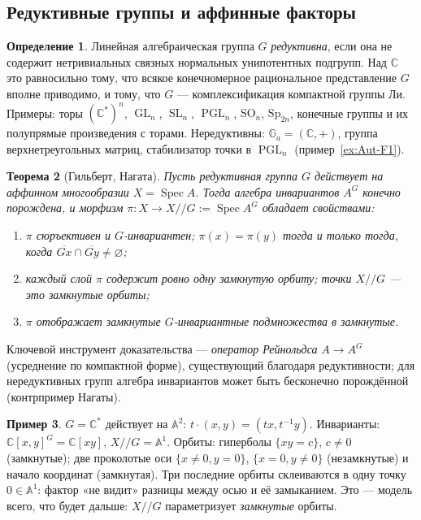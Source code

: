 \documentclass[11pt,a4paper]{article}
\theoremstyle{plain}
\newtheorem{theorem}{Теорема}[section]
\theoremstyle{definition}
\newtheorem{definition}[theorem]{Определение}
\newtheorem{example}[theorem]{Пример}
\theoremstyle{remark}
\renewcommand{\C}{\mathbb{C}}
\newcommand{\A}{\mathbb{A}}
\DeclareMathOperator{\GL}{GL}
\DeclareMathOperator{\SL}{SL}
\DeclareMathOperator{\PGL}{PGL}
\DeclareMathOperator{\Spec}{Spec}
\begin{document}
\subsection{Редуктивные группы и аффинные факторы}

\begin{definition}
Линейная алгебраическая группа $G$ \emph{редуктивна}, если она не содержит нетривиальных связных
нормальных унипотентных подгрупп. Над $\C$ это равносильно тому, что всякое конечномерное
рациональное представление $G$ вполне приводимо, и тому, что $G$ --- комплексификация компактной
группы Ли. Примеры: торы $(\C^*)^n$, $\GL_n$, $\SL_n$, $\PGL_n$, $\mathrm{SO}_n$, $\mathrm{Sp}_{2n}$,
конечные группы и их полупрямые произведения с торами. Нередуктивны: $\mathbb G_a=(\C,+)$,
группа верхнетреугольных матриц, стабилизатор точки в $\PGL_n$ (пример~\ref{ex:Aut-F1}).
\end{definition}

\begin{theorem}[Гильберт, Нагата]\label{thm:Hilbert-finiteness}
Пусть редуктивная группа $G$ действует на аффинном многообразии $X=\Spec A$. Тогда алгебра
инвариантов $A^G$ конечно порождена, и морфизм $\pi\colon X\to X/\!/G:=\Spec A^G$ обладает
свойствами:
\begin{enumerate}
\item $\pi$ сюръективен и $G$-инвариантен; $\pi(x)=\pi(y)$ тогда и только тогда, когда
$\overline{Gx}\cap\overline{Gy}\ne\varnothing$;
\item каждый слой $\pi$ содержит ровно одну замкнутую орбиту; точки $X/\!/G$ --- это замкнутые орбиты;
\item $\pi$ отображает замкнутые $G$-инвариантные подмножества в замкнутые.
\end{enumerate}
\end{theorem}

Ключевой инструмент доказательства --- \emph{оператор Рейнольдса} $A\to A^G$ (усреднение по
компактной форме), существующий благодаря редуктивности; для нередуктивных групп алгебра
инвариантов может быть бесконечно порождённой (контрпример Нагаты).

\begin{example}\label{ex:Cstar-C2}
$G=\C^*$ действует на $\A^2$: $t\cdot(x,y)=(tx,t^{-1}y)$. Инварианты: $\C[x,y]^G=\C[xy]$,
$X/\!/G=\A^1$. Орбиты: гиперболы $\{xy=c\}$, $c\ne0$ (замкнутые); две проколотые оси
$\{x\ne0,y=0\}$, $\{x=0,y\ne0\}$ (незамкнутые) и начало координат (замкнутая). Три последние
орбиты склеиваются в одну точку $0\in\A^1$: фактор «не видит» разницы между осью и её замыканием.
Это --- модель всего, что будет дальше: $X/\!/G$ параметризует \emph{замкнутые} орбиты.
\end{example}
\end{document}
